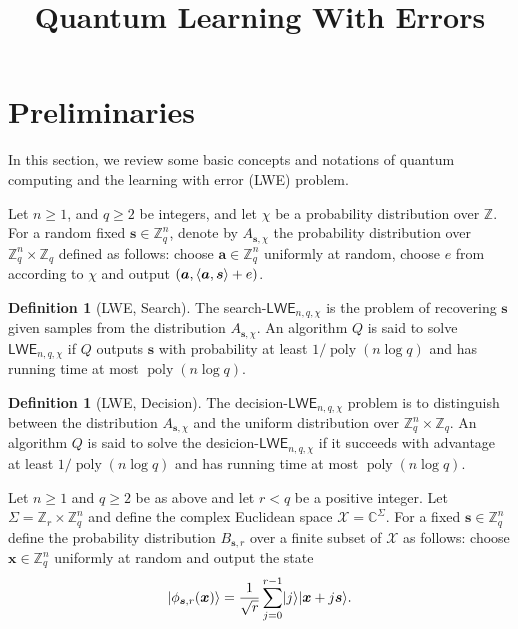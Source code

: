 \documentclass[11pt]{article}
\title{Quantum Learning With Errors}
\author{
}
\date{}
\theoremstyle{plain}
\theoremstyle{definition}
\newtheorem{definition}[theorem]{Definition}
\DeclareMathOperator{\poly}{poly}
\DeclarePairedDelimiter{\ldbrac}{\lvert}{\rangle}
\DeclarePairedDelimiter{\lrang}{\langle}{\rangle}
\def\C{\ensuremath{\mathbb{C}}}
\def\Z{\ensuremath{\mathbb{Z}}}
\def\lwe{\ensuremath{\mathsf{LWE}}}
\begin{document}
\maketitle








\section{Preliminaries}
\label{sec:preli}

In this section, we review some basic concepts and notations of quantum computing and the learning with error (LWE) problem. 

Let $n \ge 1$, and $q \ge 2$ be integers, and let $\chi$ be a probability distribution over $\Z$. For a random fixed $\bm{s} \in \Z_q^n$, denote by $A_{\bm{s}, \chi}$ the probability distribution over $\Z_q^n \times \Z_q$ defined as follows: choose $\bm{a} \in \Z_q^n$ uniformly at random, choose $e$ from according to $\chi$ and output  $(\bm{a}, \lrang{\bm{a}, \bm{s}} + e)$.
\begin{definition}[LWE, Search]
The search-$\lwe_{n, q, \chi}$ is the problem of recovering $\bm{s}$ given samples from the distribution $A_{\bm{s}, \chi}$. An algorithm $Q$ is said to solve $\lwe_{n, q, \chi}$ if $Q$  outputs $\bm{s}$ with probability at least $1 / \poly(n\log q)$ and has running time at most $\poly(n \log q)$.
\end{definition}
\begin{definition}[LWE, Decision]
    The decision-$\lwe_{n, q, \chi}$ problem is to distinguish between the distribution $A_{\bm{s}, \chi}$ and the uniform distribution over $\Z_q^n \times \Z_q$. An algorithm $Q$ is said to solve the desicion-$\lwe_{n, q, \chi}$ if it succeeds with advantage at least $1 / \poly(n\log q)$ and has running time at most $\poly(n\log q)$. 
\end{definition}
Let $n \ge 1$ and $q \ge 2$ be as above and let $r < q$ be a positive integer. Let $\Sigma = \Z_r \times \Z_q^n$ and define the complex Euclidean space $\mathcal{X} = \C^\Sigma$. For a fixed $\bm{s} \in \Z_q^n$ define the probability distribution $B_{\bm{s}, r}$ over a finite subset of $\mathcal{X}$ as follows: choose $\bm{x} \in \Z_q^n$ uniformly at random and output the state
\[ \ldbrac{\phi_{\bm{s}, r}(\bm{x})} = \frac{1}{\sqrt{r}} \sum_{j = 0}^{r - 1}\ldbrac{j}\ldbrac{\bm{x} + j\bm{s}}. \]
\end{document}
